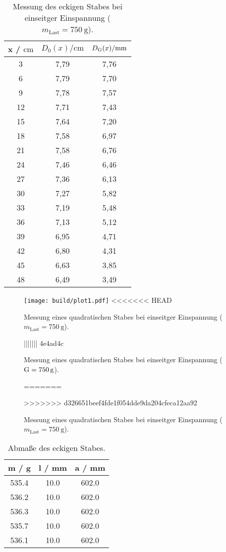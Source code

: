 \sloppy
\begin{table}[H]
  \centering
  \caption{Messung des eckigen Stabes bei einseitger Einspannung ($ m_{\text{Last}} = \SI{750}{\gram}$).}
  \label{tab:werte1}
  \begin{tabular}{c c c}
    \toprule
    x / $\si{\centi\meter} $ & $ D_0(x) / \si{\centi\meter}$ & $D_{\text G}(x) / \si{\milli\meter}$ \\
    \midrule
    3 & 7,79 & 7,76 \\
    6 & 7,79 & 7,70 \\
    9 & 7,78 & 7,57 \\
    12 & 7,71 & 7,43 \\
    15 & 7,64 & 7,20 \\
    18 & 7,58 & 6,97 \\
    21 & 7,58 & 6,76 \\
    24 & 7,46 & 6,46 \\
    27 & 7,36 & 6,13 \\
    30 & 7,27 & 5,82 \\
    33 & 7,19 & 5,48 \\
    36 & 7,13 & 5,12 \\
    39 & 6,95 & 4,71 \\
    42 & 6,80 & 4,31 \\
    45 & 6,63 & 3,85 \\
    48 & 6,49 & 3,49 \\
    \bottomrule
  \end{tabular}
\end{table}

\sloppy
\begin{figure}
  \centering
  \texttt{[image: build/plot1.pdf]}
<<<<<<< HEAD
  \caption{Messung eines quadratischen Stabes bei einseitger Einspannung ($m_{\text{Last}} = \SI{750}{\gram}$).}
||||||| 4e4ad4c
  \caption{Messung eines quadratischen Stabes bei einseitger Einspannung ($\text G = \SI{750}{\gram}$).}
=======
  \caption{Messung eines quadratischen Stabes bei einseitger Einspannung ($ m_{\text{Last}} = \SI{750}{\gram}$).}
>>>>>>> d326651beef4fde1f054dde9da204cfeca12aa92
  \label{fig:plot1}
\end{figure}

\sloppy
\begin{table}[H]
  \centering
  \caption{Abmaße des eckigen Stabes.}
  \label{tab:eckigStab}
  \begin{tabular}{c c c}
    \toprule
    m / g & l / mm & a / mm \\
    \midrule
    535.4 & 10.0 & 602.0 \\
    536.2 & 10.0 & 602.0 \\
    536.3 & 10.0 & 602.0 \\
    535.7 & 10.0 & 602.0 \\
    536.1 & 10.0 & 602.0 \\
    \bottomrule
  \end{tabular}
\end{table}

